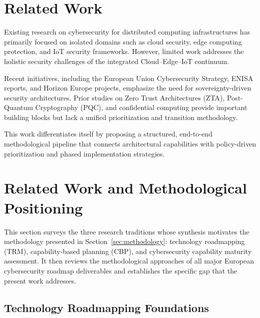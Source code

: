 \section{Related Work}

Existing research on cybersecurity for distributed computing infrastructures has primarily focused on isolated domains such as cloud security, edge computing protection, and IoT security frameworks. However, limited work addresses the holistic security challenges of the integrated Cloud--Edge--IoT continuum.

Recent initiatives, including the European Union Cybersecurity Strategy, ENISA reports, and Horizon Europe projects, emphasize the need for sovereignty-driven security architectures. Prior studies on Zero Trust Architectures (ZTA), Post-Quantum Cryptography (PQC), and confidential computing provide important building blocks but lack a unified prioritization and transition methodology.

This work differentiates itself by proposing a structured, end-to-end methodological pipeline that connects architectural capabilities with policy-driven prioritization and phased implementation strategies.


\section{Related Work and Methodological Positioning}
\label{sec:related_work}

This section surveys the three research traditions whose synthesis
motivates the methodology presented in Section~\ref{sec:methodology}:
technology roadmapping (TRM), capability-based planning (CBP), and
cybersecurity capability maturity assessment. It then reviews the
methodological approaches of all major European cybersecurity roadmap
deliverables and establishes the specific gap that the present work
addresses.

\subsection{Technology Roadmapping Foundations}
\label{sec:rw_trm}

